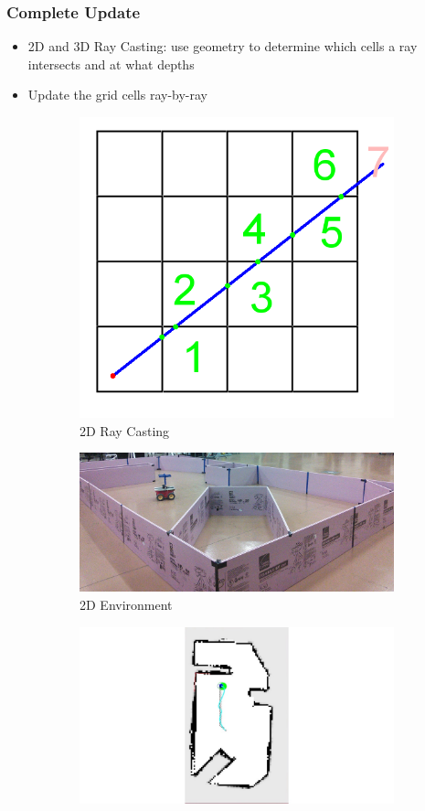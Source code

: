 \documentclass[11pt,professionalfonts,hyperref={pdftex,pdfpagemode=none,pdfstartview=FitH}]{beamer}
\begin{document}
\begin{frame}
\frametitle{Complete Update}

\begin{itemize}
	\item 2D and 3D Ray Casting: use geometry to determine which cells a ray intersects and at what depths
	\item Update the grid cells ray-by-ray
\end{itemize}

\begin{figure}
  \centering
  \begin{subfigure}[t]{.3\linewidth}
    \centering\includegraphics[height=.5\linewidth]{RayCastIllustration.png}
    \caption*{2D Ray Casting}
  \end{subfigure}
  \begin{subfigure}[t]{.3\linewidth}
    \centering\includegraphics[height=.5\linewidth]{test_setup_bottom_left_cropped.jpg}
    \caption*{2D Environment}
  \end{subfigure}
  \begin{subfigure}[t]{.3\linewidth}
    \centering\includegraphics[height=.5\linewidth]{t_end.jpg}

\end{subfigure}
\end{figure}
\end{frame}
\end{document}
